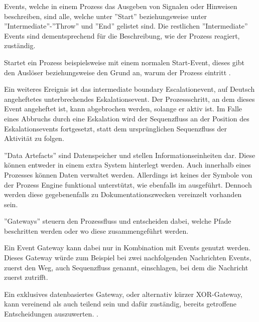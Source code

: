 Events, welche in einem Prozess das Ausgeben von Signalen oder Hinweisen beschreiben, sind alle, welche unter ''Start'' beziehungsweise unter ''Intermediate''-''Throw'' und ''End'' gelistet sind. Die restlichen ''Intermediate'' Events sind dementsprechend für die Beschreibung, wie der Prozess reagiert, zuständig.

Startet ein Prozess beispielsweise mit einem normalen Start-Event, dieses gibt den Auslöser beziehungsweise den Grund an, warum der Prozess eintritt \citep[vgl.][S. 49]{bruce_bpmn_2012}.

Ein weiteres Ereignis ist das intermediate boundary Escalationevent, auf Deutsch angeheftetes unterbrechendes Eskalationsevent. Der Prozessschritt, an dem dieses Event angeheftet ist, kann abgebrochen werden, solange er aktiv ist. Im Falle eines Abbruchs durch eine Eskalation wird der Sequenzfluss an der Position des Eskalationsevents fortgesetzt, statt dem ursprünglichen Sequenzfluss der Aktivität zu folgen. \citep[vgl.][S. 107]{bruce_englisch_2011}

''Data Artefacts'' sind Datenspeicher und stellen Informationseinheiten dar. Diese können entweder in einem extra System hinterlegt werden. Auch innerhalb eines Prozesses können Daten verwaltet werden. Allerdings ist keines der Symbole von der Prozess Engine funktional unterstützt, wie ebenfalls im  ausgeführt. Dennoch werden diese gegebenenfalls zu Dokumentationszwecken vereinzelt vorhanden sein. \citep[vgl.][S. 59]{bruce_bpmn_2012}




''Gateways'' steuern den Prozessfluss und entscheiden dabei, welche Pfade beschritten werden oder wo diese zusammengeführt werden.

Ein Event Gateway kann dabei nur in Kombination mit Events genutzt werden. Dieses Gateway würde zum Beispiel bei zwei nachfolgenden Nachrichten Events, zuerst den Weg, auch Sequenzfluss genannt, einschlagen, bei dem die Nachricht zuerst zutrifft. \citep[vgl.][S. 46]{bruce_bpmn_2012}

Ein exklusives datenbasiertes Gateway, oder alternativ kürzer XOR-Gateway, kann vereinend als auch teilend sein und dafür zuständig, bereits getroffene Entscheidungen auszuwerten. \citep[vgl.][S. 125f]{bruce_englisch_2011}. 

